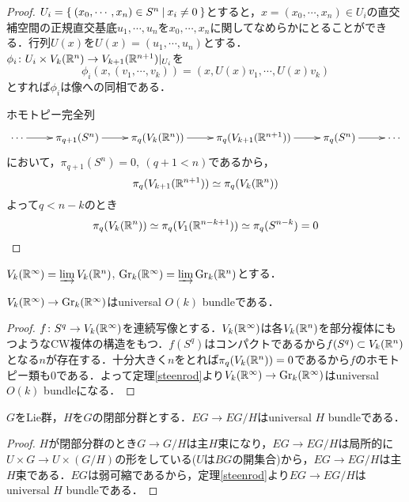 \begin{proof}
  $U_i=\left\{\:(x_0,\cdots,x_n)\in S^n\:\middle|\:x_i\neq 0\:\right\}$とすると，$x=(x_0,\cdots,x_n)\in U_i$の直交補空間の正規直交基底$u_1,\cdots,u_n$を$x_0,\cdots,x_n$に関してなめらかにとることができる．行列$U(x)$を$U(x)=(u_1,\cdots,u_n)$とする．$\phi_i\colon U_i\times V_k(\mathbb{R}^n)\rightarrow V_{k+1}(\mathbb{R}^{n+1})|_{U_i}$を
  \[
  \phi_i(x,(v_1,\cdots,v_k)) = (x,U(x)v_1,\cdots,U(x)v_k)
  \]
  とすれば$\phi_i$は像への同相である．

  ホモトピー完全列
  \[
  \xymatrix{
    \cdots \ar[r] & \pi_{q+1}(S^n) \ar[r] & \pi_q(V_k(\real^n)) \ar[r] &
    \pi_q(V_{k+1}(\real^{n+1})) \ar[r] & \pi_q(S^n) \ar[r] & \cdots
  }
  \]
  において，$\pi_{q+1}(S^n) = 0,\:(q+1 < n)$であるから，
  \[
  \pi_q(V_{k+1}(\mathbb{R}^{n+1}))\simeq \pi_q(V_{k}(\mathbb{R}^{n}))
  \]
  よって$q<n-k$のとき
  \[
  \pi_q(V_k(\mathbb{R}^n))\simeq \pi_q(V_1(\mathbb{R}^{n-k+1}))\simeq \pi_q(S^{n-k})=0
  \]
\end{proof}

$V_k(\mathbb{R}^\infty)=\varinjlim V_k(\mathbb{R}^n)$, $\text{Gr}_k(\mathbb{R}^\infty)=\varinjlim \text{Gr}_k(\mathbb{R}^n)$とする．

\begin{prop}\label{universal O(k) bundle}
  $V_k(\mathbb{R}^\infty)\rightarrow \text{Gr}_k(\mathbb{R}^\infty)$はuniversal $O(k)$ bundleである．
\end{prop}

\begin{proof}
  $f\colon S^q\rightarrow V_k(\mathbb{R}^\infty)$を連続写像とする．$V_k(\mathbb{R}^\infty)$は各$V_k(\mathbb{R}^n)$を部分複体にもつようなCW複体の構造をもつ．$f(S^q)$はコンパクトであるから$f(S^q)\subset V_k(\mathbb{R}^n)$となる$n$が存在する\cite{hatcher Top}．十分大きく$n$をとれば$\pi_q(V_k(\mathbb{R}^n))=0$であるから$f$のホモトピー類も$0$である．よって定理\ref{steenrod}より$V_k(\mathbb{R}^\infty)\rightarrow \text{Gr}_k(\mathbb{R}^\infty)$はuniversal $O(k)$ bundleになる．
\end{proof}

\begin{theo}\label{universal bundle for subgroup}
  $G$をLie群，$H$を$G$の閉部分群とする．$EG\rightarrow EG/H$はuniversal $H$ bundleである．
\end{theo}

\begin{proof}
  $H$が閉部分群のとき$G\rightarrow G/H$は主$H$束になり，$EG\rightarrow EG/H$は局所的に$U\times G\rightarrow U\times(G/H)$の形をしている($U$は$BG$の開集合)から，$EG\rightarrow EG/H$は主$H$束である．$EG$は弱可縮であるから，定理\ref{steenrod}より$EG\rightarrow EG/H$はuniversal $H$ bundleである．
\end{proof}


